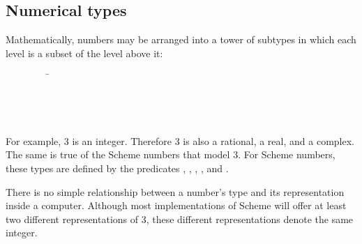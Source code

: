 
\subsection{Numerical types}
\label{numericaltypes}



\vest Mathematically, numbers may be arranged into a tower of subtypes
in which each level is a subset of the level above it:
\begin{tabbing}
\ \ \ \ \ \ \ \ \ \= \\
\>  \\
\>  \\
\>  \\
\>  
\end{tabbing}

For example, 3 is an integer.  Therefore 3 is also a rational,
a real, and a complex.  The same is true of the Scheme numbers
that model 3.  For Scheme numbers, these types are defined by the
predicates , , , ,
and .

There is no simple relationship between a number's type and its
representation inside a computer.  Although most implementations of
Scheme will offer at least two different representations of 3, these
different representations denote the same integer.

